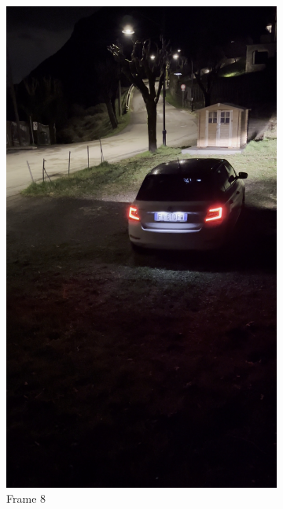 \begin{figure}[h!]
\begin{subfigure}[b]{0.24\textwidth}
        \includegraphics[width=\textwidth]{Images/featureExtractions/frame08.jpg}
        \caption{Frame 8}
    \end{subfigure}
    \begin{subfigure}[b]{0.24\textwidth}

\end{subfigure}
\end{figure}
